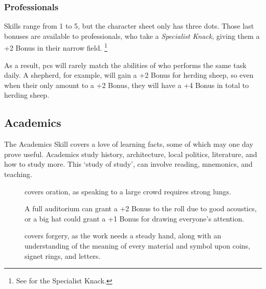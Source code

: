 \begin{multicols}{2}
\subsubsection{Professionals}
Skills range from 1 to 5, but the character sheet only has three dots.
Those last bonuses are available to professionals, who take a \textit{Specialist Knack}, giving them a +2 Bonus in their narrow field.%
\footnote{See  for the Specialist Knack.}

As a result, \glspl{pc} will rarely match the abilities of  who performs the same task daily.
A shepherd, for example, will gain a +2 Bonus for herding sheep, so even when their  only amount to a +2 Bonus, they will have a +4 Bonus in total to herding sheep.

\subsection{Academics}

The Academics Skill covers a love of learning facts, some of which may one day prove useful.
Academics study history, architecture, local politics, literature, and how to study more.
This `study of study', can involve reading, mnemonics, and teaching.


\begin{description}
  \item[]
    covers oration, as speaking to a large crowd requires strong lungs.

    A full auditorium can grant a +2 Bonus to the roll due to good acoustics, or a big hat could grant a +1 Bonus for drawing everyone's attention.
  \item[]
    covers forgery, as the work needs a steady hand, along with an understanding of the meaning of every material and symbol upon coins, signet rings, and letters.


\end{description}
\end{multicols}
